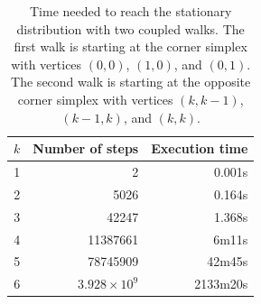 \documentclass[a4paper]{article}
\begin{document}
\begin{table}[t!]
  \centering
  \caption{Time needed to reach the stationary distribution with two coupled walks. The first walk is starting at the corner simplex with vertices $(0,0)$, $(1,0)$, and $(0,1)$. The second walk is starting at the opposite corner simplex with vertices $(k,k-1)$, $(k-1,k)$, and $(k,k)$.}
  \label{Tab.Coupling}

  \bigskip

  \begin{tabular}{|c|r|r|}
    \hline
    $k$ & Number of steps & Execution time\\
    \hline
    1 & 2 & 0.001s \\
    2 & 5026 & 0.164s \\
    3 & 42247 & 1.368s \\
    4 & 11387661 & 6m11s \\
    5 & 78745909 & 42m45s \\
    6 & $3.928 \times 10^9$ & 2133m20s \\
    \hline
  \end{tabular}
\end{table}



\end{document}

